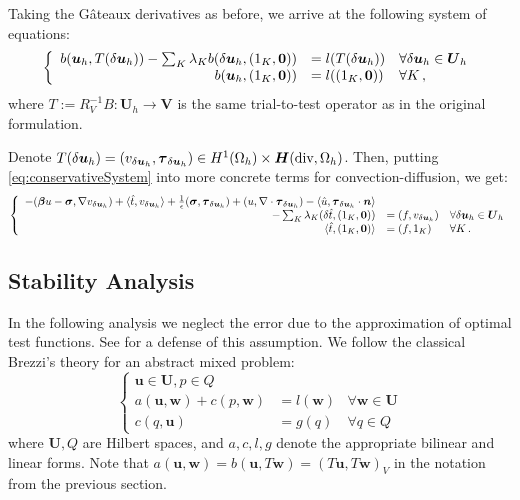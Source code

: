 \documentclass[letterpaper]{article}
\def\btau{\boldsymbol\tau}
\def\bfsigma{\boldsymbol\sigma}
\def\bbeta{\boldsymbol\beta}
\newcommand{\bs}[1]{\boldsymbol{#1}}
\newcommand{\LRp}[1]{\left( #1 \right)}
\newcommand{\bfu}{\boldsymbol u}
\newcommand{\bfU}{\boldsymbol U}
\newcommand{\bfw}{\boldsymbol w}
\newcommand{\bfH}{\mbox{\boldmath $H$}}
\newcommand{\vdeltau}{v_{\delta\bs u_h}}
\newcommand{\taudeltau}{\btau_{\delta\bs u_h}}
\begin{document}
Taking the G\^ateaux derivatives as before, we arrive at the following system
of equations:
\begin{equation}
\left\{
\begin{array}[c]{rll}
b(\bs u_h,T(\delta\bs u_h))-\sum_K\lambda_K b(\delta\bs u_h,(1_K,\bs0))
&=l(T(\delta\bs u_h)) & \forall\delta\bs u_h\in\bs U_h\\
b(\bs u_h,(1_K,\bs0)) &=l((1_K,\bs0)) & \forall K\,,
\end{array}
\right.
\label{eq:conservativeSystem}
\end{equation}
where $T:=R_V^{-1}B:\bs U_h\rightarrow\bs V$ is the same trial-to-test operator as in the original formulation.

Denote $T(\delta\bfu_h)=\LRp{\vdeltau,\taudeltau}\in
H^1(\Omega_h)\times\bfH(\text{div},\Omega_h)$.
Then, putting \eqref{eq:conservativeSystem} into more concrete terms for
convection-diffusion, we get:
\begin{equation}
\left\{
\begin{array}[c]{rll}
-(\bbeta u-\bfsigma,\nabla \vdeltau)+\langle\hat t,\vdeltau\rangle
+ \frac{1}{\epsilon}(\bfsigma,\taudeltau)
+(u,\nabla\cdot\taudeltau)
-\langle\hat u,\taudeltau\cdot\bs n\rangle\\
-\sum_K\lambda_K (\delta\hat t,(1_K,\bs0))
&=(f,\vdeltau) & \forall\delta\bs u_h\in\bs U_h\\
\langle\hat t,(1_K,\bs0)\rangle &=(f,1_K) & \forall K\,.
\end{array}
\right.
\label{eq:conservativeConfusionSystem}
\end{equation}

\subsection{Stability Analysis}

In the following analysis we neglect the error due to the approximation of optimal test functions.
See \cite{GopalakrishnanQiu11} for a defense of this assumption.
We follow the classical Brezzi's theory \cite{Brezzi1974,DBB05} for an abstract
mixed problem:
\begin{equation}
\left\{
\begin{array}{lll}
\bfu \in \bfU, p \in Q\\
a(\bfu,\bfw) + c(p,\bfw) & = l(\bfw) & \forall \bfw \in \bfU \\
c(q,\bfu) & = g(q) & \forall q \in Q
\end{array}
\right.
\end{equation}
where $\bfU,Q$ are Hilbert spaces, and $a,c,l,g$ denote the appropriate
bilinear and linear forms. Note that $a(\bfu,\bfw)=b(\bfu,T\bfw)=(T\bfu,T\bfw)_V$ in
the notation from the previous section.
\end{document}
